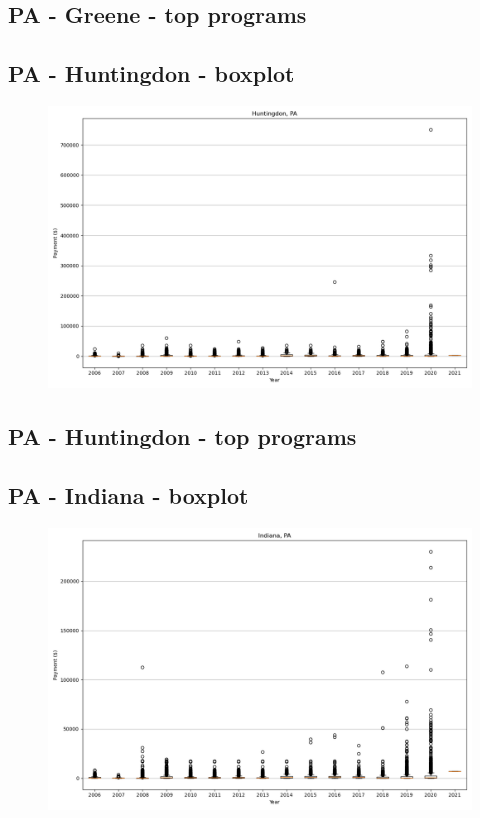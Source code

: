 \subsection*{PA - Greene - top programs}

\newpage
\subsection*{PA - Huntingdon - boxplot}
\begin{figure}[h]
\centering
\includegraphics[width=7in]{../output/boxplots/counties/Huntingdon-PA_boxplot.png}
\end{figure}


\subsection*{PA - Huntingdon - top programs}

\newpage
\subsection*{PA - Indiana - boxplot}
\begin{figure}[h]
\centering
\includegraphics[width=7in]{../output/boxplots/counties/Indiana-PA_boxplot.png}
\end{figure}



